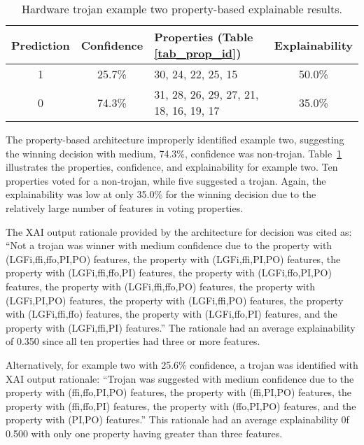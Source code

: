\begin{table}[H]
    \renewcommand{\arraystretch}{1.3}
    \centering
    \caption{Hardware trojan example two property-based explainable results.}
    \begin{tabular}{|c|c|p{}|c|}
        \hline
         Prediction &  Confidence &  Properties (Table \ref{tab_prop_id}) &  Explainability \\
        \hline
        \hline
        1 & 25.7\% & 30, 24, 22, 25, 15 & 50.0\% \\
        \hline
        0 & 74.3\% & 31, 28, 26, 29, 27, 21, 18, 16, 19, 17 & 35.0\% \\
        \hline
    \end{tabular}
    \label{tab_prop_exp_ex_2}
\end{table}

The property-based architecture improperly identified example two, suggesting
the winning decision with medium, 74.3\%, confidence was non-trojan.
Table~\ref{tab_prop_exp_ex_2} illustrates the properties, confidence, and
explainability for example two.  Ten properties voted for a non-trojan, while
five suggested a trojan.  Again, the explainability was low at only 35.0\% for
the winning decision due to the relatively large number of features in voting
properties.

The XAI output rationale provided by the
architecture for decision was cited as: ``Not a trojan was winner with medium
confidence due to the property with (LGFi,ffi,ffo,PI,PO) features, the property
with (LGFi,ffi,PI,PO) features, the property with (LGFi,ffi,ffo,PI) features,
the property with (LGFi,ffo,PI,PO) features, the property with (LGFi,ffi,ffo,PO)
features, the property with (LGFi,PI,PO) features, the property with
(LGFi,ffi,PO) features, the property with (LGFi,ffi,ffo) features, the property
with (LGFi,ffo,PI) features, and the property with (LGFi,ffi,PI) features.'' The
rationale had an average explainability of 0.350 since all ten properties had
three or more features.

Alternatively, for example two with 25.6\% confidence, a trojan was identified
with XAI output rationale: ``Trojan was suggested with medium confidence due to
the property with (ffi,ffo,PI,PO) features, the property with (ffi,PI,PO)
features, the property with (ffi,ffo,PI) features, the property with (ffo,PI,PO)
features, and the property with (PI,PO) features.''  This rationale had an average
explainability 0f 0.500 with only one property having greater than three features.

